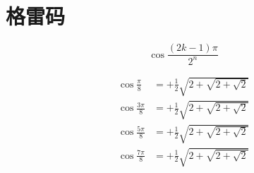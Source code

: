 \chapter{格雷码}

$$\cos\frac{(2k-1)\pi}{2^n}$$

$$
\begin{aligned}
    \cos\frac{  π}{8} &=+\frac{1}{2}\sqrt{2+\sqrt{2+\sqrt{2}}}\\
    \cos\frac{3 π}{8} &=+\frac{1}{2}\sqrt{2+\sqrt{2+\sqrt{2}}}\\
    \cos\frac{5 π}{8} &=+\frac{1}{2}\sqrt{2+\sqrt{2+\sqrt{2}}}\\
    \cos\frac{7 π}{8} &=+\frac{1}{2}\sqrt{2+\sqrt{2+\sqrt{2}}}\\
\end{aligned}
$$